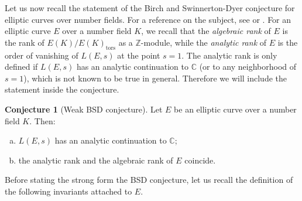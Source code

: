 \documentclass[11pt]{amsart}
\theoremstyle{definition}
\newtheorem{conj}[definizione]{Conjecture}
\begin{document}
		Let us now recall the statement of the Birch and Swinnerton-Dyer conjecture for elliptic curves over number fields. For a reference on the subject, see \cite{dok} or \cite{gro2}.
		For an elliptic curve $E$ over a number field $K$, we recall that the \emph{algebraic rank} of $E$ is the rank of $E(K)/E(K)_{\text{tors}}$ as a ${\mathbb{Z}}$-module, while the \emph{analytic rank} of $E$ is the order of vanishing of $L(E,s)$ at the point $s=1$. The analytic rank is only defined if $L(E,s)$ has an analytic continuation to ${\mathbb{C}}$ (or to any neighborhood of $s=1$), which is not known to be true in general. Therefore we will include the statement inside the conjecture.
			\begin{conj}[Weak BSD conjecture]
				 Let $E$ be an elliptic curve over a number field $K$. Then: 
					\begin{enumerate}[a)]
						\item $L(E,s)$ has an analytic continuation to ${\mathbb{C}}$;
						\item the analytic rank and the algebraic rank of $E$ coincide.
				\end{enumerate}
		\end{conj}
		Before stating the strong form the BSD conjecture, let us recall the definition of the following invariants attached to $E$.
\end{document}
